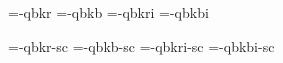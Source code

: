 

\ifx\sizespec\undefined \def\sizespec{}\fi
\ifx\font\corkencoded {}\else {}\fi

\ifx\font\unicoded  {} 
\else

\font\tenrm=\tmp-qbkr  \sizespec
\font\tenbf=\tmp-qbkb  \sizespec
\font\tenit=\tmp-qbkri \sizespec
\font\tenbi=\tmp-qbkbi \sizespec

\font\tenrmc=\tmp-qbkr-sc  \sizespec
\font\tenbfc=\tmp-qbkb-sc  \sizespec
\font\tenitc=\tmp-qbkri-sc \sizespec
\font\tenbic=\tmp-qbkbi-sc \sizespec

\fi

\tenrm

\def\caps#1{{\escapechar=-1 \expandafter}%
  \expandafter\csname\expandafter\tenonlytext\string#1c\endcsname}
\def\tenonlytext{ten}

\ifx\font\corkencoded \else  \fi

\ifx\normalTXmath\undefined  \else\normalTXmath \fi


